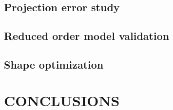 \documentclass[a4paper]{eccomas_paper-2024}
\begin{document}
%
%
%

\subsection{Projection error study} %
\label{sub:Projection error study}


\subsection{Reduced order model validation} %
\label{sub:Reduced order model validation}


\subsection{Shape optimization} %
\label{sub:Shape optimization}


\section{CONCLUSIONS} %
\label{sec:conclusions}
\end{document}
